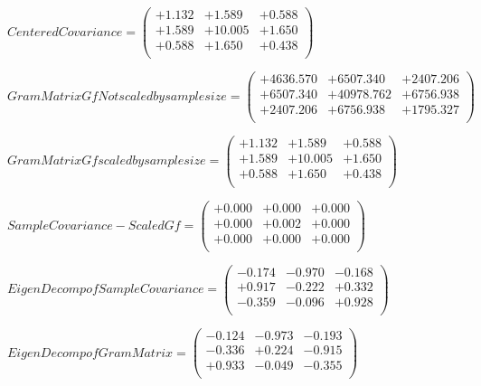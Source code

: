 \documentclass[9pt]{article}
\theoremstyle{plain}
\theoremstyle{definition}
\theoremstyle{remark}
\numberwithin{equation}{section}
\begin{document}
$Centered Covariance = \left(
\begin{array}{
ccc}
+1.132 & +1.589 & +0.588 \\
+1.589 & +10.005 & +1.650 \\
+0.588 & +1.650 & +0.438 \\
\end{array}
\right)$ \newline 

$Gram Matrix Gf Not scaled by sample size = \left(
\begin{array}{
ccc}
+4636.570 & +6507.340 & +2407.206 \\
+6507.340 & +40978.762 & +6756.938 \\
+2407.206 & +6756.938 & +1795.327 \\
\end{array}
\right)$ \newline 

$Gram Matrix Gf  scaled by sample size = \left(
\begin{array}{
ccc}
+1.132 & +1.589 & +0.588 \\
+1.589 & +10.005 & +1.650 \\
+0.588 & +1.650 & +0.438 \\
\end{array}
\right)$ \newline 

$SampleCovariance - Scaled Gf = \left(
\begin{array}{
ccc}
+0.000 & +0.000 & +0.000 \\
+0.000 & +0.002 & +0.000 \\
+0.000 & +0.000 & +0.000 \\
\end{array}
\right)$ \newline 

$EigenDecomp of SampleCovariance = \left(
\begin{array}{
ccc}
-0.174 & -0.970 & -0.168 \\
+0.917 & -0.222 & +0.332 \\
-0.359 & -0.096 & +0.928 \\
\end{array}
\right)$ \newline 

$EigenDecomp of Gram Matrix = \left(
\begin{array}{
ccc}
-0.124 & -0.973 & -0.193 \\
-0.336 & +0.224 & -0.915 \\
+0.933 & -0.049 & -0.355 \\
\end{array}
\right)$ \newline 
\end{document}
